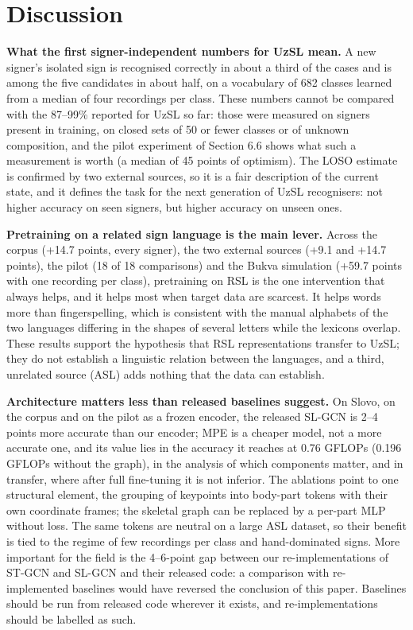 \documentclass[a4paper,fleqn]{cas-dc}
\begin{document}
\hypertarget{discussion}{%
\section{Discussion}\label{discussion}}

\textbf{What the first signer-independent numbers for UzSL mean.} A new signer's isolated sign is recognised correctly in about a third of the cases and is among the five candidates in about half, on a vocabulary of 682 classes learned from a median of four recordings per class. These numbers cannot be compared with the 87--99\% reported for UzSL so far: those were measured on signers present in training, on closed sets of 50 or fewer classes or of unknown composition, and the pilot experiment of Section 6.6 shows what such a measurement is worth (a median of 45 points of optimism). The LOSO estimate is confirmed by two external sources, so it is a fair description of the current state, and it defines the task for the next generation of UzSL recognisers: not higher accuracy on seen signers, but higher accuracy on unseen ones.

\textbf{Pretraining on a related sign language is the main lever.} Across the corpus (+14.7 points, every signer), the two external sources (+9.1 and +14.7 points), the pilot (18 of 18 comparisons) and the Bukva simulation (+59.7 points with one recording per class), pretraining on RSL is the one intervention that always helps, and it helps most when target data are scarcest. It helps words more than fingerspelling, which is consistent with the manual alphabets of the two languages differing in the shapes of several letters while the lexicons overlap. These results support the hypothesis that RSL representations transfer to UzSL; they do not establish a linguistic relation between the languages, and a third, unrelated source (ASL) adds nothing that the data can establish.

\textbf{Architecture matters less than released baselines suggest.} On Slovo, on the corpus and on the pilot as a frozen encoder, the released SL-GCN is 2--4 points more accurate than our encoder; MPE is a cheaper model, not a more accurate one, and its value lies in the accuracy it reaches at 0.76 GFLOPs (0.196 GFLOPs without the graph), in the analysis of which components matter, and in transfer, where after full fine-tuning it is not inferior. The ablations point to one structural element, the grouping of keypoints into body-part tokens with their own coordinate frames; the skeletal graph can be replaced by a per-part MLP without loss. The same tokens are neutral on a large ASL dataset, so their benefit is tied to the regime of few recordings per class and hand-dominated signs. More important for the field is the 4--6-point gap between our re-implementations of ST-GCN and SL-GCN and their released code: a comparison with re-implemented baselines would have reversed the conclusion of this paper. Baselines should be run from released code wherever it exists, and re-implementations should be labelled as such.
\end{document}
